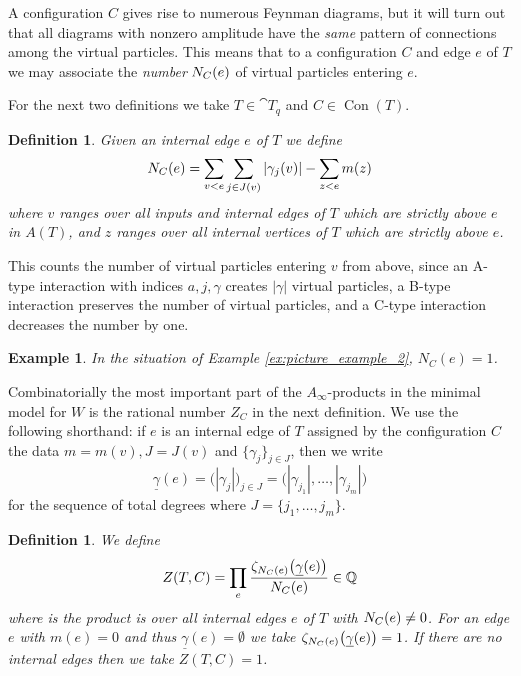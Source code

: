 \documentclass[english,letter paper,12pt,leqno]{article}
\theoremstyle{example}
\newtheorem{definition}[theorem]{Definition}
\newtheorem{example}[theorem]{Example}
\numberwithin{equation}{section}
\def\be{\begin{equation}}
\def\ee{\end{equation}}
\begin{document}
A configuration $C$ gives rise to numerous Feynman diagrams, but it will turn out that all diagrams with nonzero amplitude have the \emph{same} pattern of connections among the virtual particles. This means that to a configuration $C$ and edge $e$ of $T$ we may associate the \emph{number} $N_C(e)$ of virtual particles entering $e$.

For the next two definitions we take $T \in \cat{T}_q$ and $C \in \operatorname{Con}(T)$.

\begin{definition} Given an internal edge $e$ of $T$ we define
\[
N_C(e) = \sum_{v < e} \sum_{j \in J(v)} | \gamma_j(v) | - \sum_{z < e} m(z)
\]
where $v$ ranges over all inputs and internal edges of $T$ which are strictly above $e$ in $A(T)$, and $z$ ranges over all internal vertices of $T$ which are strictly above $e$.
\end{definition}

This counts the number of virtual particles entering $v$ from above, since an A-type interaction with indices $a,j,\gamma$ creates $|\gamma|$ virtual particles, a B-type interaction preserves the number of virtual particles, and a C-type interaction decreases the number by one.

\begin{example} In the situation of Example \ref{ex:picture_example_2}, $N_C(e) = 1$.
\end{example}

Combinatorially the most important part of the $A_\infty$-products in the minimal model for $W$ is the rational number $Z_C$ in the next definition. We use the following shorthand: if $e$ is an internal edge of $T$ assigned by the configuration $C$ the data $m = m(v), J = J(v)$ and $\{ \gamma_j \}_{j \in J}$, then we write
\be
\underline{\gamma}(e) = \big( |\gamma_j| \big)_{j \in J} = \big( |\gamma_{j_1}|, \ldots, |\gamma_{j_m}| \big)
\ee
for the sequence of total degrees where $J = \{j_1,\ldots,j_m\}$. 

\begin{definition} We define
\begin{gather*}
Z(T,C) = \prod_{e} \frac{ \zeta_{N_C(e)}\big( \underline{\gamma}(e) \big)}{ N_C(e) } \in \mathbb{Q}
\end{gather*}
where is the product is over all internal edges $e$ of $T$ with $N_C(e) \neq 0$. For an edge $e$ with $m(e) = 0$ and thus $\underline{\gamma}(e) = \emptyset$ we take $\zeta_{N_C(e)}\big( \underline{\gamma}(e) \big) = 1$. If there are no internal edges then we take $Z(T,C) = 1$.
\end{definition}
\end{document}
